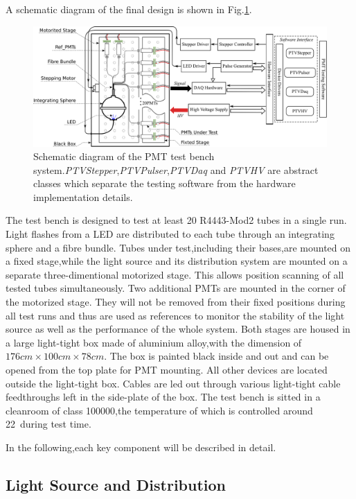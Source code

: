 \documentclass[preprint,5p,times]{elsarticle}
\begin{document}
A schematic diagram of the final design is shown in Fig.\ref{fig:testbench_overveiw}.
\begin{figure}[hb]
 \centering
 \includegraphics[width=140mm]{testbench_overview}
\caption{Schematic diagram of the PMT test bench system.\textit{PTVStepper},\textit{PTVPulser},\textit{PTVDaq} and \textit{PTVHV} are abstract classes which separate the testing software from the hardware implementation details.}
\label{fig:testbench_overveiw}
\end{figure}
The test bench is designed to test at least 20 R4443-Mod2 tubes in a single run.
Light flashes from a LED are distributed to each tube through an integrating sphere and a fibre bundle.
Tubes under test,including their bases,are mounted on a fixed stage,while the light source and its distribution system are mounted on a separate three-dimentional motorized stage.
This allows position scanning of all tested tubes simultaneously.
Two additional PMTs are mounted in the corner of the motorized stage.
They will not be removed from their fixed positions during all test runs and thus are used as references to monitor the stability of the light source as well as the performance of the whole system.
Both stages are housed in a large light-tight box made of aluminium alloy,with the dimension of $176cm\times100cm\times78cm$.
The box is painted black inside and out and can be opened from the top plate for PMT mounting.
All other devices are located outside the light-tight box.
Cables are led out through various light-tight cable feedthroughs left in the side-plate of the box.
The test bench is sitted in a cleanroom of class 100000,the temperature of which is controlled around 22\textcelsius~during test time.

In the following,each key component will be described in detail.
\subsection{Light Source and Distribution}
\label{sec:light_source}
\end{document}
